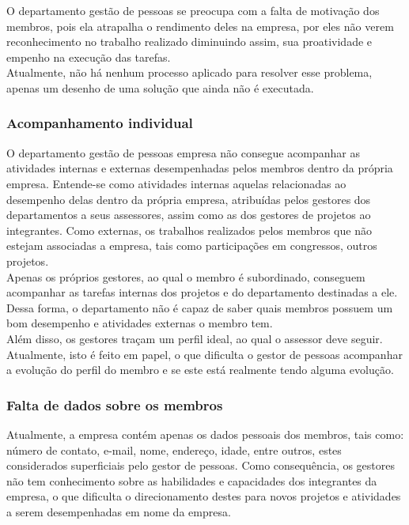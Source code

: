 \begin{anexosenv}
O departamento gestão de pessoas se preocupa com a falta de motivação dos membros, pois ela atrapalha o rendimento deles na empresa, por eles não verem reconhecimento no trabalho realizado diminuindo assim, sua proatividade e empenho na execução das tarefas.\\
Atualmente, não há nenhum processo aplicado para resolver esse problema, apenas um desenho de uma solução que ainda não é executada.\\

\subsubsection[Acompanhamento individual]{Acompanhamento individual}


O departamento gestão de pessoas empresa não consegue acompanhar as atividades internas e externas desempenhadas pelos membros dentro da própria empresa. Entende-se como atividades internas aquelas relacionadas ao desempenho delas dentro da própria empresa, atribuídas pelos gestores dos departamentos a seus assessores, assim como as dos gestores de projetos ao integrantes. Como externas, os trabalhos realizados pelos membros que não estejam associadas a empresa, tais como participações em congressos, outros projetos.\\
Apenas os próprios gestores, ao qual o membro é subordinado, conseguem acompanhar as tarefas internas dos projetos e do departamento destinadas a ele. Dessa forma, o departamento não é capaz de saber quais membros possuem um bom desempenho e atividades externas o membro tem.\\
Além disso, os gestores traçam um perfil ideal, ao qual o assessor deve seguir. Atualmente, isto é feito em papel, o que dificulta o gestor de pessoas acompanhar a evolução do perfil do membro e se este está realmente tendo alguma evolução.\\

\subsubsection[Falta de dados sobre os membros]{Falta de dados sobre os membros}

Atualmente, a empresa contém apenas os dados pessoais dos membros, tais como: número de contato, e-mail, nome, endereço, idade, entre outros, estes  considerados superficiais pelo gestor de pessoas.  Como consequência, os gestores não tem conhecimento sobre as habilidades e capacidades dos integrantes da empresa, o que dificulta o direcionamento destes para novos projetos e atividades a serem desempenhadas em nome da empresa.\\


\end{anexosenv}
